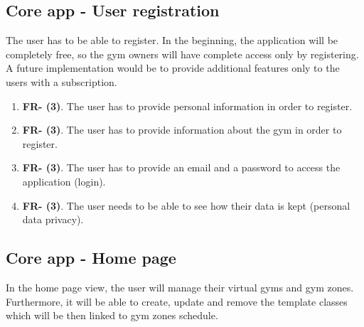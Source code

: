 \documentclass[a4paper, 12pt, oneside]{book}
\begin{document}
\subsection{Core app - User registration}
The user has to be able to register. In the beginning, the application will be completely free, so the gym owners will have complete access only by registering. A future implementation would be to provide additional features only to the users with a subscription.
\begin{enumerate}[label = -]
	\item \textbf{FR- (3)}. The user has to provide personal information in order to register.
	\item \textbf{FR- (3)}. The user has to provide information about the gym in order to register.
	\item \textbf{FR- (3)}. The user has to provide an email and a password to access the application (login).
	\item \textbf{FR- (3)}. The user needs to be able to see how their data is kept (personal data privacy).
\end{enumerate}
\subsection{Core app - Home page}
In the home page view, the user will manage their virtual gyms and gym zones. Furthermore, it will be able to create, update and remove the template classes which will be then linked to gym zones schedule.
\end{document}
